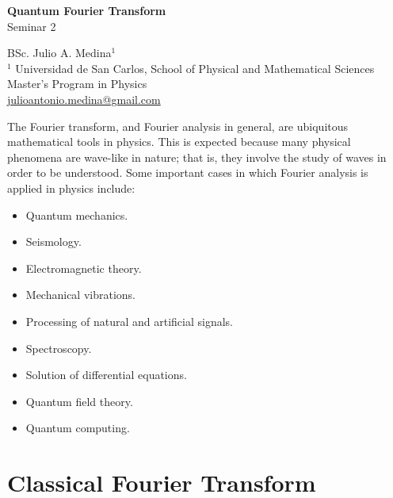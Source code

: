 \documentclass[a4paper]{article}
\begin{document}

\Large
\begin{center}
\textbf{Quantum Fourier Transform}\\
Seminar 2

\hspace{10pt}

\large
BSc. Julio A. Medina$^1$ \\

\hspace{10pt}
\small
$^1$ Universidad de San Carlos, School of Physical and Mathematical Sciences\\
Master's Program in Physics\\
\href{mailto:julioantonio.medina@gmail.com}{julioantonio.medina@gmail.com}\\
\end{center}

\hspace{10pt}

\normalsize
The Fourier transform, and Fourier analysis in general, are ubiquitous mathematical tools in physics. This is expected because many physical phenomena are wave-like in nature; that is, they involve the study of waves in order to be understood. Some important cases in which Fourier analysis is applied in physics include:

\begin{itemize}
\item Quantum mechanics.
\item Seismology.
\item Electromagnetic theory.
\item Mechanical vibrations.
\item Processing of natural and artificial signals.
\item Spectroscopy.
\item Solution of differential equations.
\item Quantum field theory.
\item Quantum computing.
\end{itemize}

\section{Classical Fourier Transform}
\end{document}
